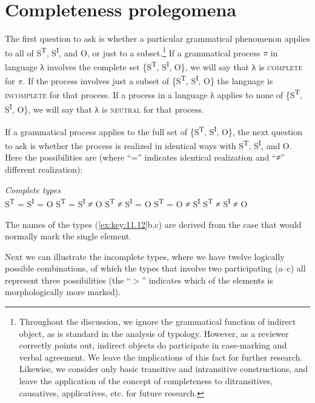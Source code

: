 \documentclass[output=paper]{langsci/langscibook}
\begin{document}
\section{Completeness prolegomena}\label{sec:key:11.3}

The first question to ask is whether a particular grammatical phenomenon
applies to all of S\textsuperscript{T}, S\textsuperscript{I}, and O, or just to
a subset.\footnote{Throughout the discussion, we ignore the grammatical
    function of indirect object, as is standard in the analysis of 
    typology. However, as a reviewer correctly points out, indirect objects do
    participate in case-marking and verbal agreement. We leave the implications
    of this fact for further research. Likewise, we consider only basic
    transitive and intransitive constructions, and leave the application of the
concept of completeness to ditransitives, causatives, applicatives, etc. for
future research.} If a grammatical process $\pi $ in language λ involves the
complete set \{S\textsuperscript{T}, S\textsuperscript{I}, O\}, we will say
that λ is \textsc{complete} for $\pi$. If the process involves just a subset of
\{S\textsuperscript{T}, S\textsuperscript{I}, O\} the language is
\textsc{incomplete} for that process. If a process in a language λ applies to
none of \{S\textsuperscript{T}, S\textsuperscript{I}, O\}, we will say that λ
is \textsc{neutral} for that process.

If a grammatical process applies to the full set of \{S\textsuperscript{T},
S\textsuperscript{I}, O\}, the next question to ask is whether the process is
realized in identical ways with S\textsuperscript{T}, S\textsuperscript{I}, and
O. Here the possibilities are (where \enquote{=} indicates identical
realization and \enquote{≠} different realization):

\ea%
    \label{ex:key:11.12}\emph{Complete types}\\
	\ea S\textsuperscript{T} = S\textsuperscript{I} = O 
	\ex S\textsuperscript{T} = S\textsuperscript{I} ≠ O 
	\ex S\textsuperscript{T} ≠ S\textsuperscript{I} = O 
	\ex S\textsuperscript{T} = O ≠ S\textsuperscript{I} 
	\ex S\textsuperscript{T} ≠ S\textsuperscript{I} ≠ O 
	\z
\z

The names of the types (\ref{ex:key:11.12}b,c) are derived from the case that
would normally mark the single element.

Next we can illustrate the incomplete  types, where we have twelve
logically possible combinations, of which the types that involve two
participating  (a--c) all represent three possibilities
(the \enquote{$>$} indicates which of the elements is morphologically more
marked).
\end{document}
